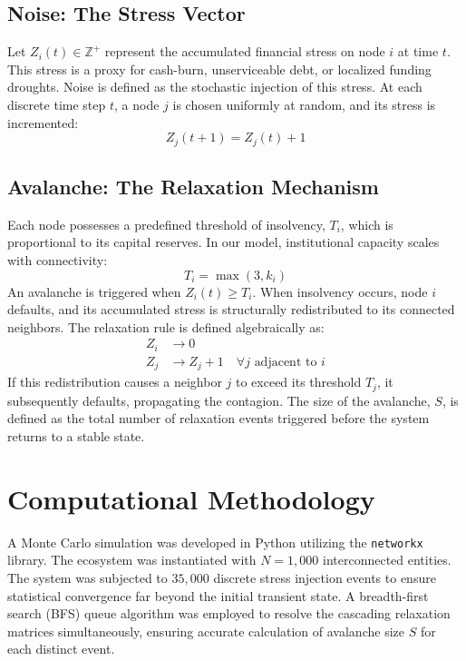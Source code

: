 \documentclass[12pt, a4paper, titlepage]{article}
\begin{document}
\subsection{Noise: The Stress Vector}
Let $Z_i(t) \in \mathbb{Z}^+$ represent the accumulated financial stress on node $i$ at time $t$. This stress is a proxy for cash-burn, unserviceable debt, or localized funding droughts. Noise is defined as the stochastic injection of this stress. At each discrete time step $t$, a node $j$ is chosen uniformly at random, and its stress is incremented:
\begin{equation}
    Z_j(t+1) = Z_j(t) + 1
\end{equation}

\subsection{Avalanche: The Relaxation Mechanism}
Each node possesses a predefined threshold of insolvency, $T_i$, which is proportional to its capital reserves. In our model, institutional capacity scales with connectivity:
\begin{equation}
    T_i = \max(3, k_i)
\end{equation}
An avalanche is triggered when $Z_i(t) \geq T_i$. When insolvency occurs, node $i$ defaults, and its accumulated stress is structurally redistributed to its connected neighbors. The relaxation rule is defined algebraically as:
\begin{align}
    Z_i &\rightarrow 0 \\
    Z_j &\rightarrow Z_j + 1 \quad \forall j \text{ adjacent to } i
\end{align}
If this redistribution causes a neighbor $j$ to exceed its threshold $T_j$, it subsequently defaults, propagating the contagion. The size of the avalanche, $S$, is defined as the total number of relaxation events triggered before the system returns to a stable state.

\section{Computational Methodology}
A Monte Carlo simulation was developed in Python utilizing the \texttt{networkx} library. The ecosystem was instantiated with $N = 1,000$ interconnected entities. The system was subjected to $35,000$ discrete stress injection events to ensure statistical convergence far beyond the initial transient state. A breadth-first search (BFS) queue algorithm was employed to resolve the cascading relaxation matrices simultaneously, ensuring accurate calculation of avalanche size $S$ for each distinct event.
\end{document}
